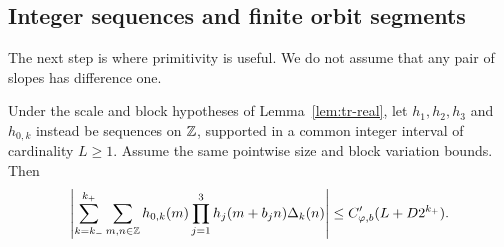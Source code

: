 \subsection{Integer sequences and finite orbit segments}

The next step is where primitivity is useful.  We do not assume that
any pair of slopes has difference one.

\begin{lemma}
\label{lem:tr-integer}
Under the scale and block hypotheses of Lemma~\ref{lem:tr-real},
let \(h_1,h_2,h_3\) and \(h_{0,k}\) instead be sequences on \(\mathbb Z\),
supported in a common integer interval of cardinality \(L\geq1\).
Assume the same pointwise size and block variation bounds.  Then
\begin{equation}
 \left|\sum_{k=k_-}^{k_+}\sum_{m,n\in\mathbb Z}
 h_{0,k}(m)\prod_{j=1}^3h_j(m+b_jn)\Delta_k(n)\right|
 \leq C'_{\varphi,b}(L+D2^{k_+}).
 \label{eq:tr-integer}
\end{equation}
\end{lemma}

